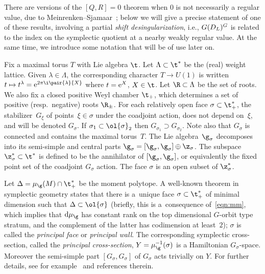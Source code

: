 There are versions of the $[Q,R]=0$ theorem when $0$ is not necessarily a regular value, due to Meinrenken--Sjamaar~\cite{MeinrenkenSjamaar}; below we will give a precise statement of one of these results, involving a partial \emph{shift desingularization}, i.e., $\index_G(D_L)^G$ is related to the index on the symplectic quotient at a nearby weakly regular value. At the same time, we introduce some notation that will be of use later on.

Fix a maximal torus $T$ with Lie algebra $\t$. Let $\Lambda \subset \t^\ast$ be the (real) weight lattice. Given $\lambda \in \Lambda$, the corresponding character $T \rightarrow U(1)$ is written $t \mapsto t^\lambda={\rm e}^{2\pi \i\pair{\lambda}{X}}$ where $t={\rm e}^X$, $X \in \t$. Let $\R \subset \Lambda$ be the set of roots. We also fix a closed positive Weyl chamber $\t_+$, which determines a set of positive (resp.\ negative) roots $\R_{\pm}$. For each relatively open face $\sigma \subset \t_+^\ast$, the stabilizer~$G_\xi$ of points~$\xi \in \sigma$ under the coadjoint action, does not depend on~$\xi$, and will be denoted $G_\sigma$. If $\sigma_1 \subset \ol{\sigma}_2$ then $G_{\sigma_1}\supset G_{\sigma_2}$. Note also that $G_\sigma$ is connected and contains the maximal torus~$T$. The Lie algebra~$\g_\sigma$ decomposes into its semi-simple and central parts
$ \g_\sigma=[\g_\sigma,\g_\sigma]\oplus \z_\sigma$.
The subspace $\z_\sigma^\ast \subset \t^\ast$ is defined to be the annihilator of $[\g_\sigma,\g_\sigma]$, or equivalently the fixed point set of the coadjoint $G_\sigma$ action. The face $\sigma$ is an open subset of $\z_\sigma^\ast$.

Let $\Delta=\mu_\g(M)\cap \t_+^\ast$ be the moment polytope. A well-known theorem in symplectic geometry states that there is a~unique face $\sigma \subset \t^\ast_+$ of minimal dimension such that $\Delta \subset \ol{\sigma}$ (briefly, this is a~consequence of~\eqref{eqn:mm}, which implies that ${\rm d}\mu_\g$ has constant rank on the top dimensional $G$-orbit type stratum, and the complement of the latter has codimension at least~$2$); $\sigma$ is called the \emph{principal face} or \emph{principal wall}. The corresponding symplectic cross-section, called the \emph{principal cross-section},
$Y=\mu_\g^{-1}(\sigma)$
is a Hamiltonian $G_\sigma$-space. Moreover the semi-simple part $[G_\sigma,G_\sigma]$ of $G_\sigma$ acts trivially on $Y$. For further details, see for example~\cite{ConvexitySympCuts} and references therein.

